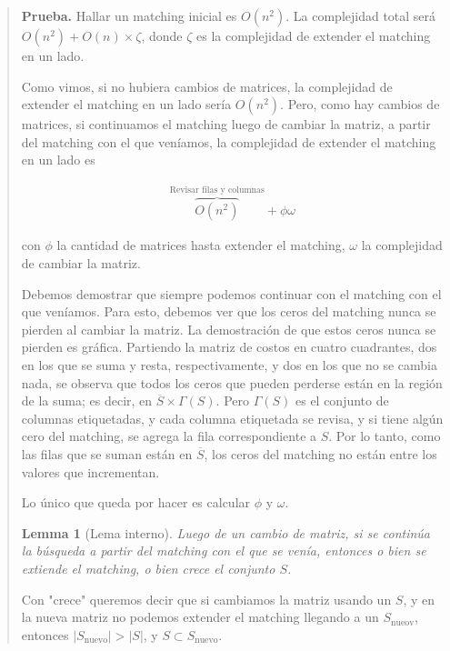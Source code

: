 \documentclass[a4paper]{article}
\newtheorem{lemma}{Lemma}
\newtheorem{lemma}{Lemma}
\begin{document}
\small
\begin{quote}

\textbf{Prueba.} Hallar un matching inicial es $O(n^2)$. La complejidad total
será $O(n^2) + O(n) \times \zeta$, donde $\zeta$ es la complejidad de extender
el matching en un lado.

Como vimos, si no hubiera cambios de matrices, la complejidad de extender el
matching en un lado sería $O(n^2)$. Pero, como hay cambios de matrices, si 
continuamos el matching luego de cambiar la matriz, a partir del matching con 
el que veníamos, la complejidad de extender el matching en un lado es

\begin{align*}
    \overbrace{O(n^2)}^{\text{Revisar filas y columnas}} + \phi \omega
\end{align*}

con $\phi$ la cantidad de matrices hasta extender el matching, $\omega$ la
complejidad de cambiar la matriz.

Debemos demostrar que siempre podemos continuar con el matching con el que
veníamos. Para esto, debemos ver que los ceros del matching nunca se pierden al
cambiar la matriz. La demostración de que estos ceros nunca se pierden es
gráfica. Partiendo la matriz de costos en cuatro cuadrantes, dos en los que se
suma y resta, respectivamente, y dos en los que no se cambia nada, se observa
que todos los ceros que pueden perderse están en la región de la suma; es
decir, en $\overline{S} \times \Gamma(S)$. Pero $\Gamma(S)$ es el conjunto 
de columnas etiquetadas, y cada columna etiquetada se revisa, y si tiene
algún cero del matching, se agrega la fila correspondiente a $S$. Por lo tanto,
como las filas que se suman están en $\overline{S}$, los ceros del matching no 
están entre los valores que incrementan.

Lo único que queda por hacer es calcular $\phi$ y $\omega$.

\begin{lemma}[Lema interno]
    Luego de un cambio de matriz, si se continúa la búsqueda a partir del 
    matching con el que se venía, entonces o bien se extiende el matching, o bien 
    crece el conjunto $S$.
\end{lemma}

Con "crece" queremos decir que si cambiamos la matriz usando un $S$, y en la nueva
matriz no podemos extender el matching llegando a un $S_{\text{nueov}}$, entonces $|S_{\text{nuevo}}| > |S|$, 
y $S \subset S_{\text{nuevo}}$.



\end{quote}
\end{document}
